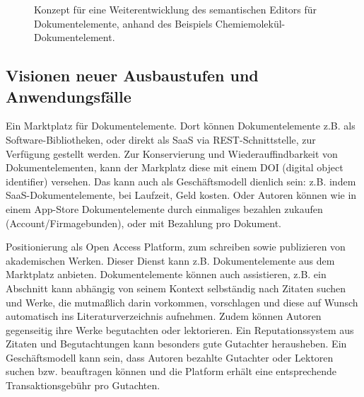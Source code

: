  
\begin{figure}[h!]
\centering
\advance\leftskip-2.5cm
\caption{ Konzept für eine Weiterentwicklung des semantischen Editors für Dokumentelemente, anhand des Beispiels Chemiemolekül-Dokumentelement. }\label{semanticeditor}
\end{figure}
 
\subsection{Visionen neuer Ausbaustufen und Anwendungsfälle}\label{}
 
Ein Marktplatz für Dokumentelemente. Dort können Dokumentelemente z.B. als Software-Bibliotheken, oder direkt als SaaS via REST-Schnittstelle, zur Verfügung gestellt werden. Zur Konservierung und Wiederauffindbarkeit von Dokumentelementen, kann der Markplatz diese mit einem DOI (digital object identifier) versehen. Das kann auch als Geschäftsmodell dienlich sein: z.B. indem SaaS-Dokumentelemente, bei Laufzeit, Geld kosten. Oder Autoren können wie in einem App-Store Dokumentelemente durch einmaliges bezahlen zukaufen (Account/Firmagebunden), oder mit Bezahlung pro Dokument.

 
Positionierung als Open Access Platform, zum schreiben sowie publizieren von akademischen Werken. Dieser Dienst kann z.B. Dokumentelemente aus dem Marktplatz anbieten. Dokumentelemente können auch assistieren, z.B. ein Abschnitt kann abhängig von seinem Kontext selbständig nach Zitaten suchen und Werke, die mutmaßlich darin vorkommen, vorschlagen und diese auf Wunsch automatisch ins Literaturverzeichnis aufnehmen. Zudem können Autoren gegenseitig ihre Werke begutachten oder lektorieren. Ein Reputationssystem aus Zitaten und Begutachtungen kann besonders gute Gutachter herausheben. Ein Geschäftsmodell kann sein, dass Autoren bezahlte Gutachter oder Lektoren suchen bzw. beauftragen können und die Platform erhält eine entsprechende Transaktionsgebühr pro Gutachten.

